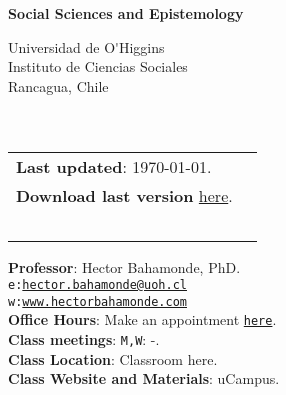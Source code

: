 \documentclass[letterpaper]{article}
\def\name{Social Sciences and Epistemology}
\begin{document}

\centerline{\huge \bf \name}

\vspace{0.25in}

\begin{minipage}{0.45\linewidth}
 Universidad de O\'\unskip Higgins \\
  Instituto de Ciencias Sociales \\
  Rancagua, Chile\\
  \\
  \\

\end{minipage}
\hspace{4cm}\begin{minipage}{0.45\linewidth}
  \begin{tabular}{ll}
{\bf Last updated}: \today. \\
 {\bf Download last version} \href{https://github.com/hbahamonde/Comparative_Politics_UGRAD/raw/master/Bahamonde_Comparative_Politics_Syllabus_UGRAD.pdf}{here}.\\
   {\bf {\color{red}{\scriptsize Not intended as a definitive version}}} %
    \\
    \\
    \\
    \\
    \\
  \end{tabular}
\end{minipage}

\vspace{-5mm}
{\bf Professor}: Hector Bahamonde, PhD.\\
\texttt{e:}\href{mailto:hector.bahamonde@uoh.cl}{\texttt{hector.bahamonde@uoh.cl}}\\
\texttt{w:}\href{http://www.hectorbahamonde.com}{\texttt{www.hectorbahamonde.com}}\\
{\bf Office Hours}: Make an appointment \href{https://calendly.com/bahamonde/officehours}{\texttt{here}}.\\

\vspace{1mm}
{\bf Class meetings}: \texttt{M,\unskip W}: {\unskip}-{\unskip}.\\
{\bf Class Location}: {\color{red}Classroom here}.\\
{\bf Class Website and Materials}: uCampus.
\end{document}

